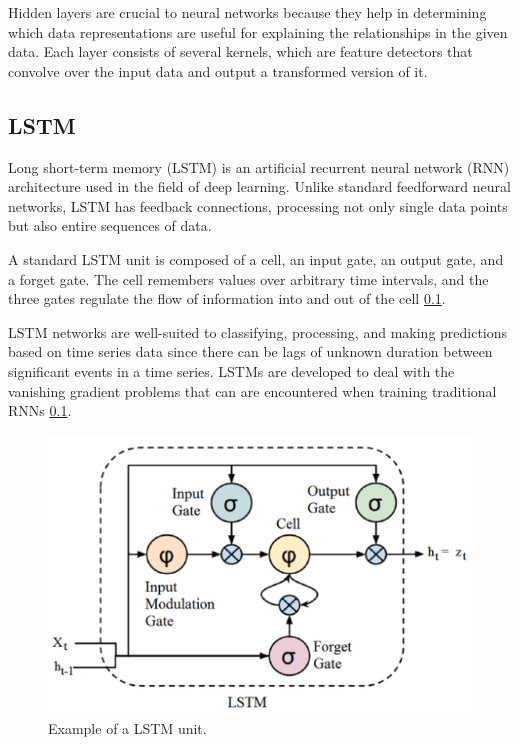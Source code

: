 \documentclass{turabian-thesis}
\begin{document}
Hidden layers are crucial to neural networks because they help in determining which data representations are useful for explaining the relationships in the given data. Each layer consists of several kernels,  which are feature detectors that convolve over the input data and output a transformed version of it. 



\subsection{LSTM}

Long short-term memory (LSTM) is an artificial recurrent neural network (RNN) architecture used in the field of deep learning. Unlike standard feedforward neural networks, LSTM has feedback connections, processing not only single data points but also entire sequences of data. 

A standard LSTM unit is composed of a cell, an input gate, an output gate, and a forget gate. The cell remembers values over arbitrary time intervals, and the three gates regulate the flow of information into and out of the cell \ref{}.

LSTM networks are well-suited to classifying, processing, and making predictions based on time series data since there can be lags of unknown duration between significant events in a time series. LSTMs are developed to deal with the vanishing gradient problems that can are encountered when training traditional RNNs \ref{}. 

\begin{figure}[h!]
   \begin{center}
      \includegraphics[scale=0.5]{../media/lstm_highlight.png}
   \end{center}
   \caption{Example of a LSTM unit.}
   \label{fig:reinforcementAgent}
\end{figure}
\end{document}
